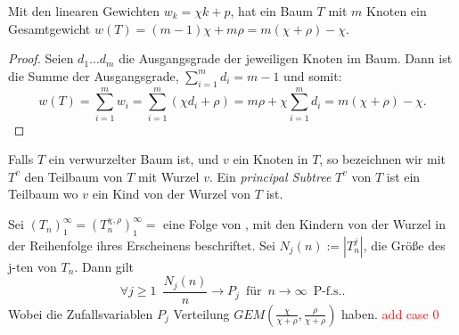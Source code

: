 \begin{theorem}
\cite[Lemma 3.1]{janson2019random}
\label{Gewichte Satz}
   Mit den linearen Gewichten $w_k = \chi k + p $, hat ein Baum $T$ mit $m$ Knoten ein Gesamtgewicht $w(T) = (m-1)\chi + m\rho = m(\chi + \rho) - \chi$.
\end{theorem}
\begin{proof}
    Seien $d_1...d_m$ die Ausgangsgrade der jeweiligen Knoten im Baum. Dann ist die Summe der Ausgangsgrade, $\sum_{i=1}^{m}d_i = m-1$ und somit:
    \[
     w(T) = \sum_{i=1}^{m}w_i = \sum_{i=1}^{m} (\chi d_i + \rho) = m \rho + \chi \sum_{i = 1}^{m} d_i = m(\chi + \rho) - \chi.
    \]
\end{proof}
\begin{Definition}
    Falls $T$ ein verwurzelter Baum ist, und $v$ ein Knoten in $T$, so bezeichnen wir mit $T^v$ den Teilbaum von $T$ mit Wurzel $v$. Ein \textit{principal Subtree} $T^v$ von $T$ ist ein Teilbaum wo $v$ ein Kind von der Wurzel von $T$ ist.
\end{Definition}
\begin{theorem} \cite[Theorem 3.2]{janson2019random}
    \label{linpreft Grenzwert}
    Sei $(T_n)_1^\infty =(T_n^{\chi,\rho})_1^\infty = $ eine Folge von \linpreft, mit den Kindern von der Wurzel in der Reihenfolge ihres Erscheinens beschriftet. Sei $N_j(n) := |T^j_n|$, die Größe des j-ten \PsubT von $T_n$. Dann gilt 
    \[ 
        \forall j \geq 1  \hspace{6pt} \frac{N_j(n)}{n}  \rightarrow P_j \hspace{6pt} \text{für} \hspace{6pt} n \rightarrow \infty \hspace{6pt} \text{P-f.s.}.
  \]
Wobei die Zufallsvariablen  $P_j$ Verteilung $GEM(\frac{\chi}{\chi+\rho},{\frac{\rho}{\chi+\rho}})$ haben. \textcolor{red}{add case 0} 
\end{theorem}

